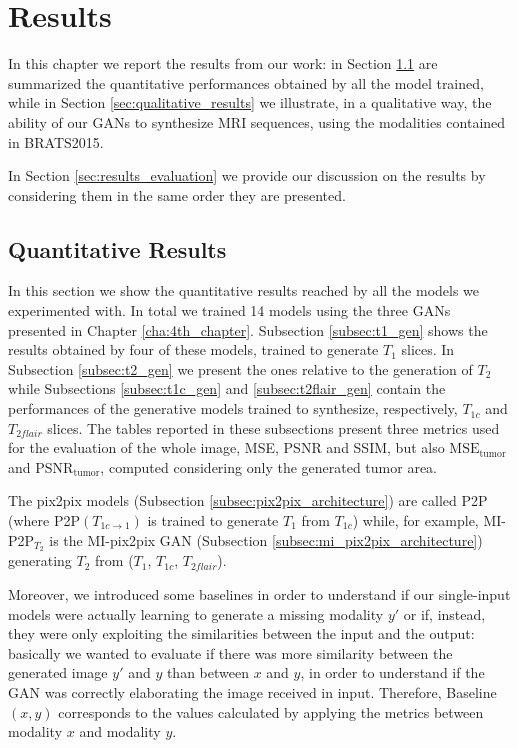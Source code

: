 \chapter{Results}
\label{cha:5th_chapter}
In this chapter we report the results from our work: in Section \ref{sec:quantitative_results} are summarized the quantitative performances obtained by all the model trained, while in Section \ref{sec:qualitative_results} we illustrate, in a qualitative way, the ability of our \ac{GAN}s to synthesize MRI sequences, using the modalities contained in BRATS2015. 

In Section \ref{sec:results_evaluation} we provide our discussion on the results by considering them in the same order they are presented.

\section{Quantitative Results}
\label{sec:quantitative_results}

In this section we show the quantitative results reached by all the models we experimented with.
In total we trained 14 models using the three \ac{GAN}s presented in Chapter \ref{cha:4th_chapter}. Subsection \ref{subsec:t1_gen} shows the results obtained by four of these models, trained to generate $T_1$ slices.
In Subsection \ref{subsec:t2_gen} we present the ones relative to the generation of $T_2$ while Subsections \ref{subsec:t1c_gen} and \ref{subsec:t2flair_gen} contain the performances of the generative models trained to synthesize, respectively, $T_{1c}$ and $T_{2flair}$ slices. The tables reported in these subsections present three metrics used for the evaluation of the whole image, MSE, PSNR and SSIM, but also $\mathrm{MSE_{tumor}}$ and $\mathrm{PSNR_{tumor}}$, computed considering only the generated tumor area.

\vspace{5mm} %
The pix2pix models (Subsection \ref{subsec:pix2pix_architecture}) are called P2P (where P2P$(T_{1c \rightarrow 1})$ is trained to generate $T_1$ from $T_{1c}$) while, for example, MI-P2P{$_{T_2}$} is the MI-pix2pix \ac{GAN} (Subsection \ref{subsec:mi_pix2pix_architecture}) generating ${T_2}$ from ($T_{1}$, $T_{1c}$, $T_{2flair}$).

\vspace{5mm} %
Moreover, we introduced some baselines in order to understand if our single-input models were actually learning to generate a missing modality $y'$ or if, instead, they were only exploiting the similarities between the input and the output: basically we wanted to evaluate if there was more similarity between the generated image $y'$ and $y$ than between $x$ and $y$, in order to understand if the \ac{GAN} was correctly elaborating the image received in input. Therefore, Baseline$(x,y)$ corresponds to the values calculated by applying the metrics between modality $x$ and modality $y$.

